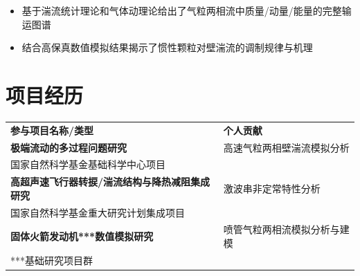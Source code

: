 \documentclass[]{deedy-resume-openfont}
\begin{document}
\begin{minipage}[t]{0.73\textwidth}
    \sectionsep

    

    \vspace*{-1ex}
    \begin{itemize}\itemsep1pt \parskip0pt 
        \item 基于湍流统计理论和气体动理论给出了气粒两相流中质量/动量/能量的完整输运图谱
        \item 结合高保真数值模拟结果揭示了惯性颗粒对壁湍流的调制规律与机理
    \end{itemize}






    \section{项目经历}
    \begin{tabular}{ll}
        {\color{date}\bf 参与项目名称/类型}                     & {\color{date}\bf 个人贡献}  \vspace*{1ex}\\
        {\bf 极端流动的多过程问题研究}                     & 高速气粒两相壁湍流模拟分析  \\
        {\color{subheadings} 国家自然科学基金基础科学中心项目} & \vspace*{1ex}  \\
        {\bf 高超声速飞行器转捩/湍流结构与降热减阻集成研究}          & 激波串非定常特性分析     \\
        {\color{subheadings} 国家自然科学基金重大研究计划集成项目} & \vspace*{1ex}  \\
        {\bf 固体火箭发动机***数值模拟研究}                 & 喷管气粒两相流模拟分析与建模 \\
        {\color{subheadings} ***基础研究项目群}       & \vspace*{1ex}  \\
    \end{tabular}
    \sectionsep


\end{minipage}
\end{document}
